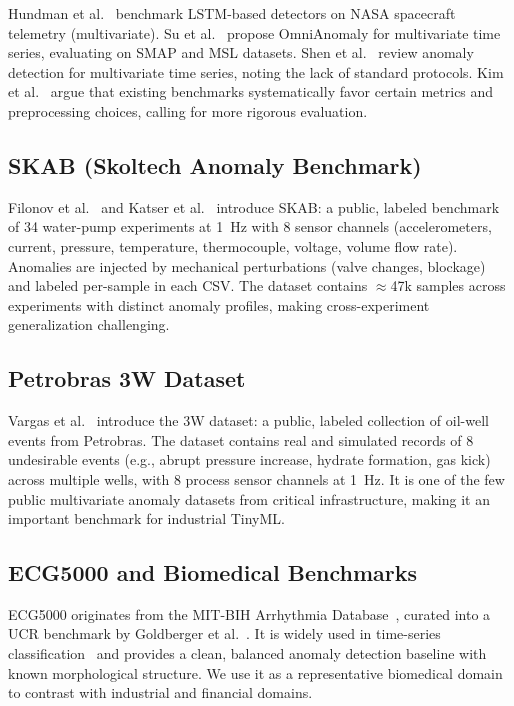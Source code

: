 \documentclass[conference]{IEEEtran}
\begin{document}
Hundman et al.~\cite{hundman2018detecting} benchmark LSTM-based detectors
on NASA spacecraft telemetry (multivariate).
Su et al.~\cite{su2019robust} propose OmniAnomaly for multivariate
time series, evaluating on SMAP and MSL datasets.
Shen et al.~\cite{shen2020timeseries} review anomaly detection for
multivariate time series, noting the lack of standard protocols.
Kim et al.~\cite{kim2022towards} argue that existing benchmarks
systematically favor certain metrics and preprocessing choices, calling
for more rigorous evaluation.

\subsection{SKAB (Skoltech Anomaly Benchmark)}

Filonov et al.~\cite{filonov2016multivariate} and Katser et al.~\cite{katser2021skoltech}
introduce SKAB: a public, labeled benchmark of 34 water-pump experiments
at 1~Hz with 8 sensor channels (accelerometers, current, pressure,
temperature, thermocouple, voltage, volume flow rate).
Anomalies are injected by mechanical perturbations (valve changes, blockage)
and labeled per-sample in each CSV.
The dataset contains $\approx$47k samples across experiments with distinct
anomaly profiles, making cross-experiment generalization challenging.

\subsection{Petrobras 3W Dataset}

Vargas et al.~\cite{vargas2019realistic} introduce the 3W dataset:
a public, labeled collection of oil-well events from Petrobras.
The dataset contains real and simulated records of 8 undesirable events
(e.g., abrupt pressure increase, hydrate formation, gas kick)
across multiple wells, with 8 process sensor channels at 1~Hz.
It is one of the few public multivariate anomaly datasets from critical
infrastructure, making it an important benchmark for industrial TinyML.

\subsection{ECG5000 and Biomedical Benchmarks}

ECG5000 originates from the MIT-BIH Arrhythmia Database~\cite{moody2001impact},
curated into a UCR benchmark by Goldberger et al.~\cite{goldberger2000physiobank}.
It is widely used in time-series classification~\cite{bagnall2017great} and
provides a clean, balanced anomaly detection baseline with known morphological
structure.
We use it as a representative biomedical domain to contrast with industrial
and financial domains.
\end{document}
